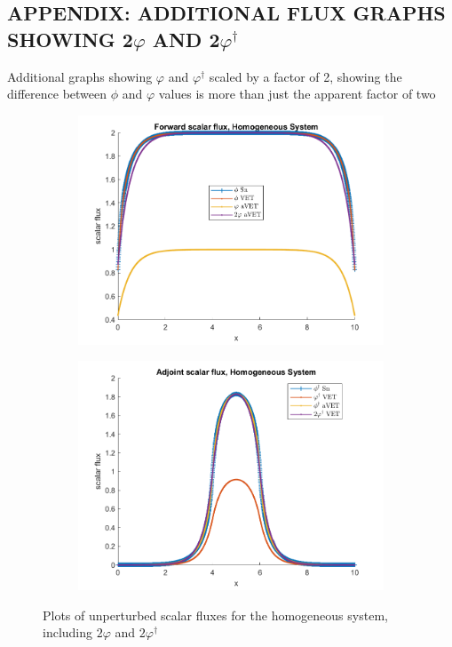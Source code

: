 \documentclass[12pt]{report}
\begin{document}
\begin{appendices}
\chapter{ \uppercase{ APPENDIX: Additional Flux Graphs showing 2$\varphi$ and 2$\varphi^\dag$}} \label{chap:appx3}
Additional graphs showing $\varphi$ and $\varphi^\dag$ scaled by a factor of 2, showing the difference between $\phi$ and $\varphi$ values is more than just the apparent factor of two
\begin{figure}[H]
\centering
\begin{subfigure}{.5\textwidth}
  \centering
  \includegraphics[width=.98\linewidth]{figures2/22phi2.png}
\end{subfigure}%
\begin{subfigure}{.5\textwidth}
  \centering
  \includegraphics[width=.98\linewidth]{figures2/22phia2.png}
\end{subfigure}
\caption{Plots of unperturbed scalar fluxes for the homogeneous system, including $2\varphi$ and $2\varphi^\dag$ }
\label{fig:2Flux1}
\end{figure}


\end{appendices}
\end{document}
